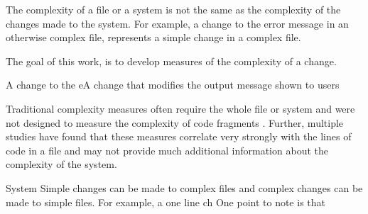 
The complexity of a file or a system is not the same as the complexity of the
changes made to the system. For example, a change to the error message in an
otherwise complex file, represents a simple change in a complex file.


The goal of this work, is to develop measures of the complexity of a change.



A change to the eA change that modifies the output message shown to users

Traditional complexity measures often require the whole file or system and were
not designed to measure the complexity of code fragments \cite{Hindle2008ICPC}.
Further, multiple studies have found that these measures correlate very
strongly with the lines of code in a file
\cite{Graves2000IEEE,Leszak2002JSS,Herraiz2007MSR} and may not provide much
additional information about the complexity of the system.



System 
Simple changes can be made to complex files and complex changes can be made to simple files. For example, a one line ch
One
point to note is that 
